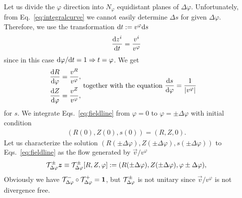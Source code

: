 Let us divide the $\varphi$ direction into $N_\varphi$ equidistant planes of
$\Delta \varphi$. Unfortunately, from Eq.~\eqref{eq:integralcurve} we cannot easily determine
$\Delta s$ for given $\Delta \varphi$. Therefore, we use the transformation $\mathrm{d} t := v^\varphi \mathrm{d} s$
\begin{align}
    \frac{\mathrm{d} z^i}{\mathrm{d} t} = \frac{v^i}{v^\varphi}
    \label{}
\end{align}
since in this case $\mathrm{d}\varphi/\mathrm{d} t = 1 \Rightarrow t=\varphi$. We get
\begin{subequations}
\begin{align}
    \frac{\d R}{\d\varphi}&= \frac{v^R}{v^\varphi},\\ %
    \frac{\d Z}{\d\varphi}&=\frac{v^Z}{v^\varphi},%
\end{align}
\text{ together with the equation  }
\begin{align}
    \frac{\d s}{\d\varphi} &= \frac{1}{|v^\varphi|} %
    \label{eq:fieldlinec}
\end{align}
\label{eq:fieldline}
\end{subequations}
for $s$.
We integrate Eqs.~\eqref{eq:fieldline} from $\varphi=0$ to $\varphi=\pm \Delta \varphi$
with initial condition
\begin{align}
    (R(0), Z(0), s(0)) = (R, Z, 0).
    \label{}
\end{align}
Let us characterize the solution $(R(\pm \Delta \varphi), Z(\pm \Delta \varphi), s(\pm \Delta \varphi))$ to Eqs.~\eqref{eq:fieldline} as the flow generated by $\vec v/v^\varphi$
\begin{align}
    \mathcal T^\pm_{\Delta\varphi}{\boldsymbol{z}} \equiv \mathcal T^\pm_{\Delta\varphi}[R, Z, \varphi]:= ( R(\pm \Delta\varphi), Z( \pm \Delta\varphi), \varphi\pm\Delta \varphi),
    \label{}
\end{align}
Obviously we have $\mathcal T^-_{\Delta\varphi}\circ\mathcal T^+_{\Delta\varphi} = \mathbf{1}$, but $\mathcal T^\pm_{\Delta\varphi}$ is not unitary since $\vec v/v^\varphi$ is
not divergence free.

